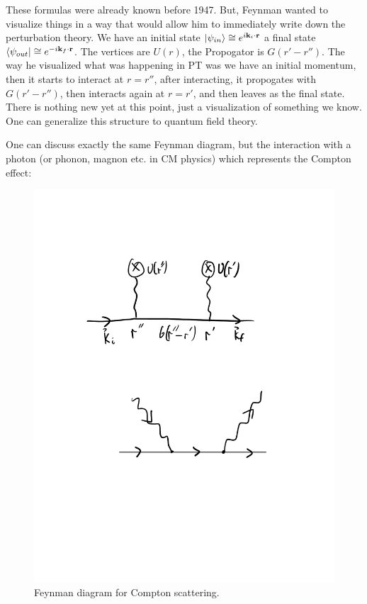 These formulas were already known before 1947. But, Feynman wanted to visualize things in a way that would allow him to immediately write down the perturbation theory. We have an initial state $\lvert \psi_{in} \rangle \cong e^{i\mathbf{k}_i \cdot \mathbf{r}}$ a final state $\langle \psi_{out} \rvert \cong e^{-i\mathbf{k}_f \cdot \mathbf{r}}$. The vertices are $U(r)$, the Propogator is $G(r' - r'')$. The way he visualized what was happening in PT was we have an initial momentum, then it starts to interact at $r = r''$, after interacting, it propogates with $G(r' - r'')$, then interacts again at $r = r'$, and then leaves as the final state. There is nothing new yet at this point, just a visualization of something we know. One can generalize this structure to quantum field theory.

One can discuss exactly the same Feynman diagram, but the interaction with a photon (or phonon, magnon etc. in CM physics) which represents the Compton effect:

\begin{figure}[htbp]
    \centering
    \includegraphics[scale=0.8]{Images/fig-feynmancompton.pdf}
    
    \caption{Feynman diagram for Compton scattering.}
    \label{fig-feynmancompton}
\end{figure}

